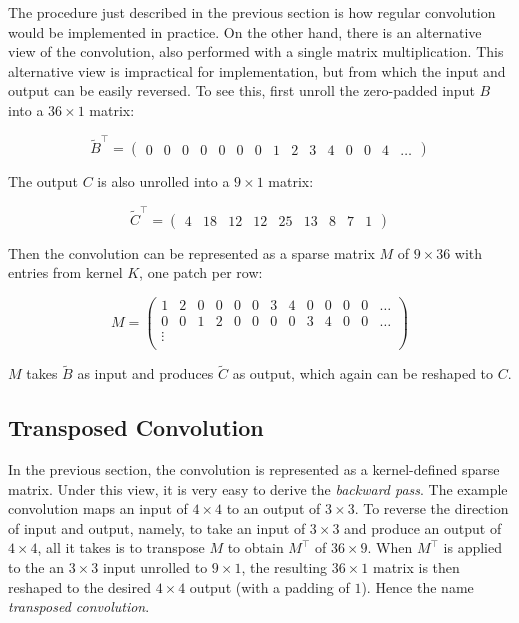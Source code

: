 The procedure just described in the previous section is how regular convolution would be implemented in
practice. On the other hand, there is an alternative view of the convolution, also performed with a single
matrix multiplication. This alternative view is impractical for implementation, but from which
the input and output can be easily reversed. To see this, first unroll the zero-padded input $B$ into
a $36 \times 1$ matrix:

\setcounter{MaxMatrixCols}{20}

$$
\tilde{B}^\intercal =
  \begin{pmatrix}
    0 & 0 & 0 & 0 & 0 & 0 & 0 & 1 & 2 & 3 & 4 & 0 & 0 & 4 & \dots
  \end{pmatrix}
$$

The output $C$ is also unrolled into a $9 \times 1$ matrix:

$$
\tilde{C}^\intercal =
  \begin{pmatrix}
    4 & 18 & 12 & 12 & 25 & 13 & 8 & 7 & 1
  \end{pmatrix}
$$

Then the convolution can be represented as a sparse matrix $M$ of $9 \times 36$ with entries from kernel $K$,
one patch per row:

$$
M =
  \begin{pmatrix}
    1 & 2 & 0 & 0 & 0 & 0 & 3 & 4 & 0 & 0 & 0 & 0 & \dots \\
    0 & 0 & 1 & 2 & 0 & 0 & 0 & 0 & 3 & 4 & 0 & 0 & \dots \\
    \vdots \\
  \end{pmatrix}
$$

$M$ takes $\tilde{B}$ as input and produces $\tilde{C}$ as output, which again can be reshaped to $C$.

\subsection{Transposed Convolution}

In the previous section, the convolution is represented as a kernel-defined sparse matrix. Under this view,
it is very easy to derive the \textit{backward pass}. The example convolution maps an input of $4 \times 4$
to an output of $3 \times 3$. To reverse the direction of input and output, namely, to take an input of
$3 \times 3$ and produce an output of $4 \times 4$, all it takes is to transpose $M$ to obtain $M^\intercal$
of $36 \times 9$. When $M^\intercal$ is applied to the an $3 \times 3$ input unrolled to $9 \times 1$, the
resulting $36 \times 1$ matrix is then reshaped to the desired $4 \times 4$ output (with a padding of $1$). Hence the name
\textit{transposed convolution}.

